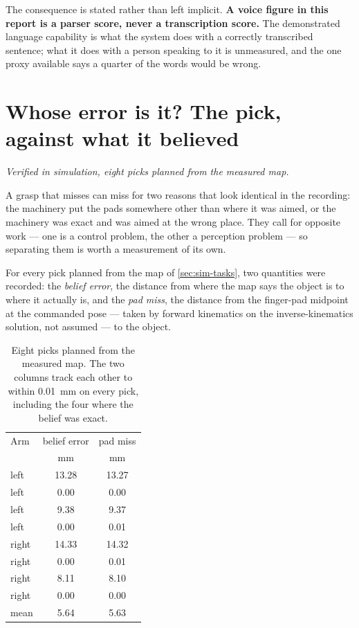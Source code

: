 The consequence is stated rather than left implicit. \textbf{A voice figure in
this report is a parser score, never a transcription score.} The demonstrated
language capability is what the system does with a correctly transcribed
sentence; what it does with a person speaking to it is unmeasured, and the one
proxy available says a quarter of the words would be wrong.

\section{Whose error is it? The pick, against what it believed}
\label{sec:whose-error}

\emph{Verified in simulation, eight picks planned from the measured map.}

A grasp that misses can miss for two reasons that look identical in the
recording: the machinery put the pads somewhere other than where it was aimed,
or the machinery was exact and was aimed at the wrong place. They call for
opposite work --- one is a control problem, the other a perception problem ---
so separating them is worth a measurement of its own.

For every pick planned from the map of \cref{sec:sim-tasks}, two quantities
were recorded: the \emph{belief error}, the distance from where the map says
the object is to where it actually is, and the \emph{pad miss}, the distance
from the finger-pad midpoint at the commanded pose --- taken by forward
kinematics on the inverse-kinematics solution, not assumed --- to the object.

\begin{table}[htbp]
  \centering
  \small
  \caption[Pad miss against belief error]{Eight picks planned from the
  measured map. The two columns track each other to within
  \SI{0.01}{\milli\metre} on every pick, including the four where the belief
  was exact.}
  \label{tab:whose-error}
  \begin{tabular}{@{}lcc@{}}
    \toprule
    Arm & belief error & pad miss \\
    & \si{\milli\metre} & \si{\milli\metre} \\
    \midrule
    left  & \num{13.28} & \num{13.27} \\
    left  & \num{0.00}  & \num{0.00}  \\
    left  & \num{9.38}  & \num{9.37}  \\
    left  & \num{0.00}  & \num{0.01}  \\
    right & \num{14.33} & \num{14.32} \\
    right & \num{0.00}  & \num{0.01}  \\
    right & \num{8.11}  & \num{8.10}  \\
    right & \num{0.00}  & \num{0.00}  \\
    \midrule
    mean  & \num{5.64}  & \num{5.63}  \\
    \bottomrule
  \end{tabular}
\end{table}

